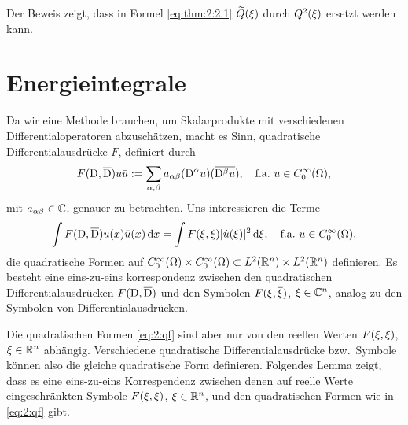 \begin{rem}
Der Beweis zeigt,
dass in Formel \eqref{eq:thm:2:2.1} $\widetilde{Q}(\xi)$
durch $Q^2(\xi)$ ersetzt werden kann.
\end{rem}

\section{Energieintegrale}

Da wir eine Methode brauchen,
um Skalarprodukte mit verschiedenen Differentialoperatoren abzuschätzen,
macht es Sinn, quadratische Differentialausdrücke $F$, definiert durch
\begin{equation}
F(\mathrm D,\overline{\mathrm D})u\bar{u}
:=\sum_{\alpha,\beta}a_{\alpha\beta}(\mathrm D^\alpha u)(\overline{\mathrm D^\beta u}),
\quad\text{f.a.}~u\in C^\infty_0(\Omega),
\end{equation}
mit $a_{\alpha\beta}\in\mathbb C$, genauer zu betrachten.
Uns interessieren die Terme
\begin{equation}\label{eq:2:qf}
\int F(\mathrm D,\overline{\mathrm D})u(x)\bar{u}(x)\,\mathrm d x
=\int F(\xi,\xi)\lvert\hat{u}(\xi)\rvert^2\,\mathrm d \xi,
\quad\text{f.a.}~u\in C^\infty_0(\Omega),
\end{equation}
die quadratische Formen auf $C^\infty_0(\Omega)\times C^\infty_0(\Omega)\subset L^2(\mathbb R^n)\times L^2(\mathbb R^n)$
definieren.
Es besteht eine eins-zu-eins korrespondenz
zwischen den quadratischen Differentialausdrücken $F(\mathrm D,\overline{\mathrm D})$
und den Symbolen $F(\xi,\overline{\xi})$, $\xi\in\mathbb C^n$,
analog zu den Symbolen von Differentialausdrücken.

Die quadratischen Formen \eqref{eq:2:qf}
sind aber nur von den reellen Werten $F(\xi,\xi)$, $\xi\in\mathbb R^n$ abhängig.
Verschiedene quadratische Differentialausdrücke bzw.~Symbole
können also die gleiche quadratische Form definieren.
Folgendes Lemma zeigt, dass es eine eins-zu-eins
Korrespendenz zwischen denen auf reelle Werte eingeschränkten
Symbole $F(\xi,\xi)$, $\xi\in\mathbb R^n$,
und den quadratischen Formen wie in \eqref{eq:2:qf} gibt.

